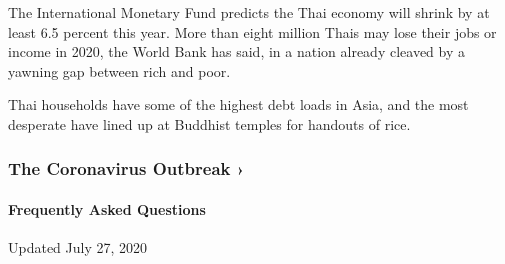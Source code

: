 The International Monetary Fund predicts the Thai economy will shrink by
at least 6.5 percent this year. More than eight million Thais may lose
their jobs or income in 2020, the World Bank has said, in a nation
already cleaved by a yawning gap between rich and poor.

Thai households have some of the highest debt loads in Asia, and the
most desperate have lined up at Buddhist temples for handouts of rice.

\href{https://www.nytimes3xbfgragh.onion/news-event/coronavirus?action=click\&pgtype=Article\&state=default\&region=MAIN_CONTENT_3\&context=storylines_faq}{}

\hypertarget{the-coronavirus-outbreak-}{%
\subsubsection{The Coronavirus Outbreak
›}\label{the-coronavirus-outbreak-}}

\hypertarget{frequently-asked-questions}{%
\paragraph{Frequently Asked
Questions}\label{frequently-asked-questions}}

Updated July 27, 2020

